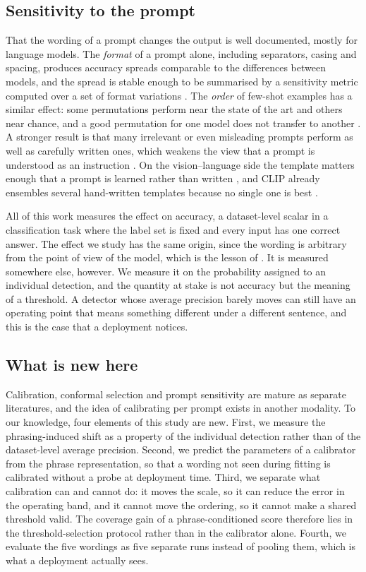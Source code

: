 \subsection{Sensitivity to the prompt}

That the wording of a prompt changes the output is well documented, mostly for language
models. The \emph{format} of a prompt alone, including separators, casing and spacing,
produces accuracy spreads comparable to the differences between models, and the spread is
stable enough to be summarised by a sensitivity metric computed over a set of format
variations \citep{sclar2024quantifying}. The \emph{order} of few-shot examples has a similar
effect: some permutations perform near the state of the art and others near chance, and a good
permutation for one model does not transfer to another \citep{lu2022fantastically}. A stronger
result is that many irrelevant or even misleading prompts perform as well as carefully written
ones, which weakens the view that a prompt is understood as an instruction
\citep{webson2022prompts}. On the vision--language side the template matters enough that a
prompt is learned rather than written \citep{zhou2022learning}, and CLIP already ensembles
several hand-written templates because no single one is best \citep{radford2021learning}.

All of this work measures the effect on accuracy, a dataset-level scalar in a classification
task where the label set is fixed and every input has one correct answer. The effect we study
has the same origin, since the wording is arbitrary from the point of view of the model, which
is the lesson of \citet{webson2022prompts}. It is measured somewhere else, however. We measure
it on the probability assigned to an individual detection, and the quantity at stake is not
accuracy but the meaning of a threshold. A detector whose average precision barely moves can
still have an operating point that means something different under a different sentence, and
this is the case that a deployment notices.

\subsection{What is new here}

Calibration, conformal selection and prompt sensitivity are mature as separate literatures,
and the idea of calibrating per prompt exists in another modality. To our knowledge, four
elements of this study are new. First, we measure the phrasing-induced shift as a property of
the individual detection rather than of the dataset-level average precision. Second, we
predict the parameters of a calibrator from the phrase representation, so that a wording not
seen during fitting is calibrated without a probe at deployment time. Third, we separate what
calibration can and cannot do: it moves the scale, so it can reduce the error in the operating
band, and it cannot move the ordering, so it cannot make a shared threshold valid. The coverage
gain of a phrase-conditioned score therefore lies in the threshold-selection protocol rather
than in the calibrator alone. Fourth, we evaluate the five wordings as five separate runs
instead of pooling them, which is what a deployment actually sees.
